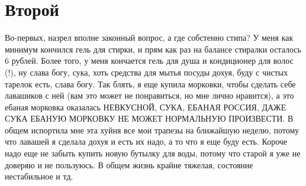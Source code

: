 \documentclass[a4paper, 12pt]{article}
\begin{document}
\section{Второй}
Во-первых, назрел вполне законный вопрос, а где собстенно стипа? У меня как минимум кончился гель для стирки, и прям как раз на балансе стиралки осталось 6 рублей. Более того, у меня кончается гель для душа и кондиционер для волос (!), ну слава богу, сука, хоть средства для мытья посуды дохуя, буду с чистых тарелок есть, слава богу. Так блять, я еще купила морковки, чтобы сделать себе лавашиков с ней (вам это может не понравиться, но мне лично нравится), а это ебаная морковка оказалась НЕВКУСНОЙ, СУКА, ЕБАНАЯ РОССИЯ, ДАЖЕ СУКА ЕБАНУЮ МОРКОВКУ НЕ МОЖЕТ НОРМАЛЬНУЮ ПРОИЗВЕСТИ. В общем испортила мне эта хуйня все мои трапезы на ближайшую неделю, потому что лавашей я сделала дохуя и есть их надо, а то что я еще буду есть. Короче надо еще не забыть купить новую бутылку для воды, потому что старой я уже не доверяю и не пользуюсь. В общем жизнь крайне тяжелая, состояние нестабильное и тд.
\end{document}
